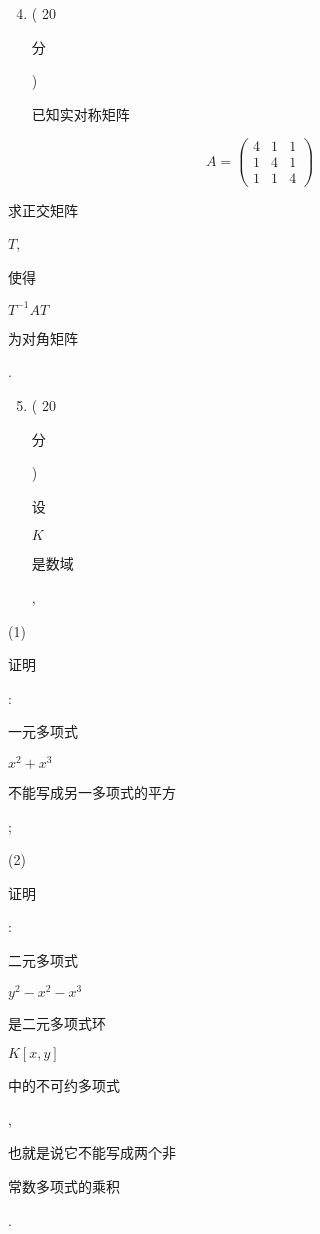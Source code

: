 \documentclass[10pt]{article}
\begin{document}
\begin{enumerate}
  \setcounter{enumi}{3}
  \item ( 20 \begin{CJK}{UTF8}{mj}分\end{CJK}) \begin{CJK}{UTF8}{mj}已知实对称矩阵\end{CJK}
\end{enumerate}
$$
A=\left(\begin{array}{lll}
4 & 1 & 1 \\
1 & 4 & 1 \\
1 & 1 & 4
\end{array}\right)
$$
\begin{CJK}{UTF8}{mj}求正交矩阵\end{CJK} $T$, \begin{CJK}{UTF8}{mj}使得\end{CJK} $T^{-1} A T$ \begin{CJK}{UTF8}{mj}为对角矩阵\end{CJK}.

\begin{enumerate}
  \setcounter{enumi}{4}
  \item ( 20 \begin{CJK}{UTF8}{mj}分\end{CJK}) \begin{CJK}{UTF8}{mj}设\end{CJK} $K$ \begin{CJK}{UTF8}{mj}是数域\end{CJK},
\end{enumerate}
(1) \begin{CJK}{UTF8}{mj}证明\end{CJK}: \begin{CJK}{UTF8}{mj}一元多项式\end{CJK} $x^{2}+x^{3}$ \begin{CJK}{UTF8}{mj}不能写成另一多项式的平方\end{CJK};

(2) \begin{CJK}{UTF8}{mj}证明\end{CJK}: \begin{CJK}{UTF8}{mj}二元多项式\end{CJK} $y^{2}-x^{2}-x^{3}$ \begin{CJK}{UTF8}{mj}是二元多项式环\end{CJK} $K[x, y]$ \begin{CJK}{UTF8}{mj}中的不可约多项式\end{CJK}, \begin{CJK}{UTF8}{mj}也就是说它不能写成两个非\end{CJK} \begin{CJK}{UTF8}{mj}常数多项式的乘积\end{CJK}.
\end{document}
